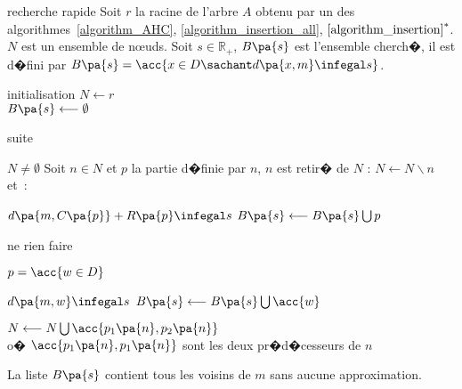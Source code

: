         \begin{xalgorithm}{recherche rapide}\label{algorithm_optimisation}%
        Soit $r$ la racine de l'arbre $A$ obtenu par un des algorithmes~\ref{algorithm_AHC},
        \ref{algorithm_insertion_all},
        $\ref{algorithm_insertion}^*$. $N$ est un ensemble de n\oe uds. Soit $s \in \mathbb{R}_+$, $B\pa{s}$ est 
        l'ensemble cherch�, il est d�fini par $B\pa{s} = \acc{ x \in D \sachant d\pa{x,m} \infegal s }$.
        
        \begin{xalgostep}{initialisation}
            $N \longleftarrow r$ \\
            $B\pa{s} \longleftarrow \emptyset$
        \end{xalgostep}
        
        \begin{xalgostep}{suite}\label{space_algo_step_B}
            \begin{xwhile}{$N \neq \emptyset$}
                Soit $n \in N$ et $p$ la partie d�finie par $n$, $n$ est retir� de $N$ : 
                                            $N \longleftarrow N \backslash n$
                et~: \\
                \begin{xif}{$d\pa{m, C\pa{p}} + R\pa{p}\infegal s $}
                    $B\pa{s} \longleftarrow B\pa{s} \bigcup p$
                    
                                ne rien faire
                \xelse
                    \begin{xif}{$p = \acc{ w \in D}$}
                            \begin{xif}{$d\pa{m, w} \infegal s$}
                                $B\pa{s} \longleftarrow B\pa{s} \bigcup \acc{w}$
                            \end{xif}
                    \xelse
                        $N \longleftarrow N \bigcup \acc{p_1\pa{n},p_2\pa{n}}$\\
                        o� $\acc{p_1\pa{n},p_1\pa{n}}$ sont les deux pr�d�cesseurs de $n$
                    \end{xif}
                \end{xif}
            \end{xwhile}
        \end{xalgostep} 
        
        La liste $B\pa{s}$ contient tous les voisins de $m$ sans aucune approximation.
        \end{xalgorithm}


